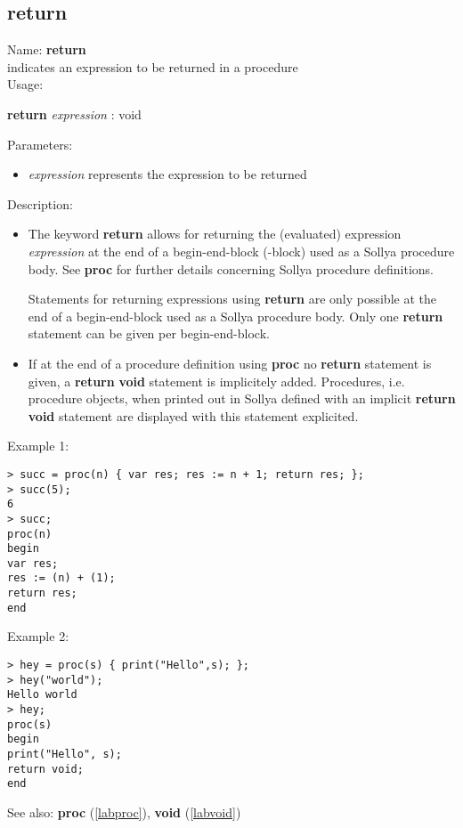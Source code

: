 \subsection{return}
\label{labreturn}
\noindent Name: \textbf{return}\\
indicates an expression to be returned in a procedure\\

\noindent Usage: 
\begin{center}
\textbf{return} \emph{expression} : \textsf{void}\\
\end{center}
Parameters: 
\begin{itemize}
\item \emph{expression} represents the expression to be returned
\end{itemize}
\noindent Description: \begin{itemize}

\item The keyword \textbf{return} allows for returning the (evaluated) expression
   \emph{expression} at the end of a begin-end-block ({}-block) used as a
   Sollya procedure body. See \textbf{proc} for further details concerning
   Sollya procedure definitions.
     
   Statements for returning expressions using \textbf{return} are only possible
    at the end of a begin-end-block used as a Sollya procedure
    body. Only one \textbf{return} statement can be given per begin-end-block.

\item If at the end of a procedure definition using \textbf{proc} no \textbf{return}
   statement is given, a \textbf{return} \textbf{void} statement is implicitely
   added. Procedures, i.e. procedure objects, when printed out in Sollya
   defined with an implicit \textbf{return} \textbf{void} statement are displayed with
   this statement explicited.
\end{itemize}
\noindent Example 1: 
\begin{center}\begin{minipage}{15cm}\begin{Verbatim}[frame=single]
> succ = proc(n) { var res; res := n + 1; return res; };
> succ(5);
6
> succ;
proc(n)
begin
var res;
res := (n) + (1);
return res;
end
\end{Verbatim}
\end{minipage}\end{center}
\noindent Example 2: 
\begin{center}\begin{minipage}{15cm}\begin{Verbatim}[frame=single]
> hey = proc(s) { print("Hello",s); };
> hey("world");
Hello world
> hey;
proc(s)
begin
print("Hello", s);
return void;
end
\end{Verbatim}
\end{minipage}\end{center}
See also: \textbf{proc} (\ref{labproc}), \textbf{void} (\ref{labvoid})

